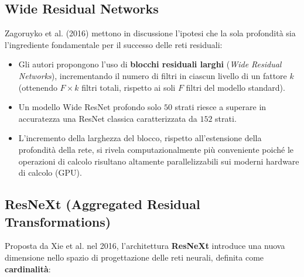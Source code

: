 ﻿\documentclass[11pt, a4paper]{article}
\begin{document}

\subsection{Wide Residual Networks}

Zagoruyko et al. (2016) mettono in discussione l'ipotesi che la sola profondità sia l'ingrediente fondamentale per il successo delle reti residuali:

\begin{itemize}
    \item Gli autori propongono l'uso di \textbf{blocchi residuali larghi} (\emph{Wide Residual Networks}), incrementando il numero di filtri in ciascun livello di un fattore $k$ (ottenendo $F \times k$ filtri totali, rispetto ai soli $F$ filtri del modello standard).
    \item Un modello Wide ResNet profondo solo $50$ strati riesce a superare in accuratezza una ResNet classica caratterizzata da $152$ strati.
    \item L'incremento della larghezza del blocco, rispetto all'estensione della profondità della rete, si rivela computazionalmente più conveniente poiché le operazioni di calcolo risultano altamente parallelizzabili sui moderni hardware di calcolo (GPU).
\end{itemize}


\subsection{ResNeXt (Aggregated Residual Transformations)}

Proposta da Xie et al. nel 2016, l'architettura \textbf{ResNeXt} introduce una nuova dimensione nello spazio di progettazione delle reti neurali, definita come \textbf{cardinalità}:
\end{document}
